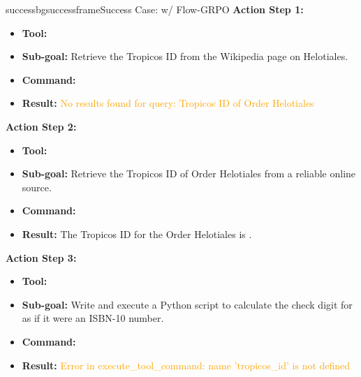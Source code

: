 \begin{small}
\begin{center}
\begin{casebox}{successbg}{successframe}{Success Case: \model w/ Flow-GRPO}
    \textbf{Action Step 1:}
    \begin{itemize}[nosep, leftmargin=*]
        \item \textbf{Tool:} 
        \item \textbf{Sub-goal:} Retrieve the Tropicos ID from the Wikipedia page on Helotiales.
        \item \textbf{Command:}

        \item \textbf{Result:} \textcolor{orange}{No results found for query: Tropicos ID of Order Helotiales}
    \end{itemize}

    \vspace{1em}

    \textbf{Action Step 2:}
    \begin{itemize}[nosep, leftmargin=*]
        \item \textbf{Tool:} 
        \item \textbf{Sub-goal:} Retrieve the Tropicos ID of Order Helotiales from a reliable online source.
        \item \textbf{Command:}

        \item \textbf{Result:} The Tropicos ID for the Order Helotiales is .
    \end{itemize}

    \vspace{1em}

    \textbf{Action Step 3:}
    \begin{itemize}[nosep, leftmargin=*]
        \item \textbf{Tool:} 
        \item \textbf{Sub-goal:} Write and execute a Python script to calculate the check digit for  as if it were an ISBN-10 number.
        \item \textbf{Command:}

        \item \textbf{Result:} \textcolor{orange}{Error in execute\_tool\_command: name 'tropicos\_id' is not defined}
    \end{itemize}


\end{casebox}
\end{center}
\end{small}
